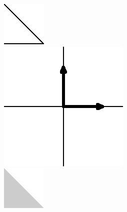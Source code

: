 \documentclass{article}
\begin{document}
\includegraphics[width=0.8\linewidth]{test-001-mp}\\
\includegraphics[width=0.8\linewidth]{test-002-mp}\\
\includegraphics[width=0.8\linewidth]{test-003-mp}\\
\end{document}
